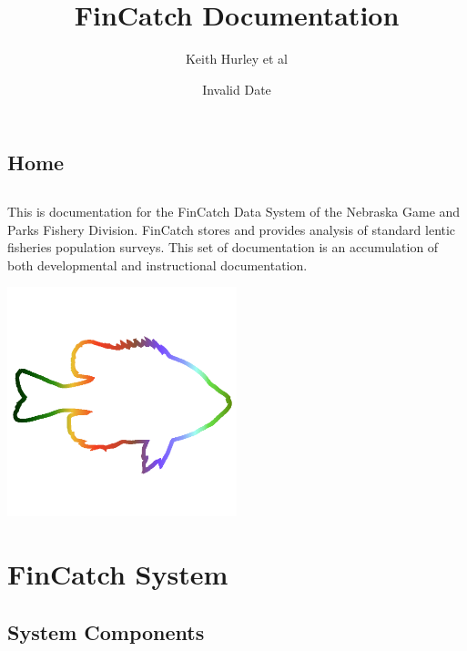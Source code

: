 \documentclass[
  letterpaper,
  DIV=11,
  numbers=noendperiod]{scrreprt}
\title{FinCatch Documentation}
\author{Keith Hurley et al}
\date{Invalid Date}
\renewcommand*\contentsname{Table of contents}
\newcommand\contentsname{Table of contents}
\begin{document}
\maketitle

\renewcommand*\contentsname{Table of contents}
{
\hypersetup{linkcolor=}
\setcounter{tocdepth}{2}
\tableofcontents
}

\chapter*{Home}\label{Home}



\chapter*{}\label{section}

\markboth{}{}

This is documentation for the FinCatch Data System of the Nebraska Game
and Parks Fishery Division. FinCatch stores and provides analysis of
standard lentic fisheries population surveys. This set of documentation
is an accumulation of both developmental and instructional
documentation.

\begin{center}
\includegraphics[width=0.5\textwidth,height=\textheight]{images/FinCatchIcon.png}
\end{center}

\part{FinCatch System}

\chapter{System Components}\label{system-components}
\end{document}
